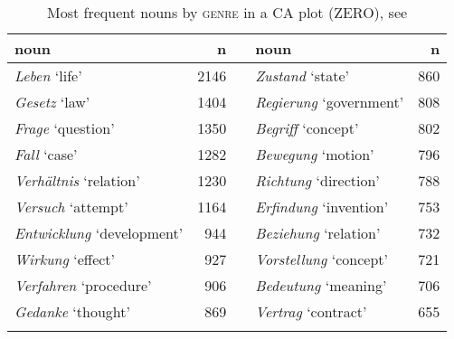 \documentclass[output=paper,colorlinks,citecolor=brown]{langscibook}
\begin{document}
\begin{table}[H]
\begin{tabularx}{\textwidth}{lr X lr}
\lsptoprule
{noun} &  n && noun & n\\
\midrule
\textit{Leben} ‘life' & 2146  &&               \textit{Zustand} ‘state' & 860\\
\textit{Gesetz} ‘law' & 1404  &&               \textit{Regierung} ‘government' & 808\\
\textit{Frage} ‘question' & 1350  &&           \textit{Begriff} ‘concept' & 802\\
\textit{Fall} ‘case' & 1282  &&                \textit{Bewegung} ‘motion' & 796\\
\textit{Verhältnis} ‘relation' & 1230  &&      \textit{Richtung} ‘direction' & 788\\
\textit{Versuch} ‘attempt' & 1164  &&          \textit{Erfindung} ‘invention' & 753\\
\textit{Entwicklung} ‘development' & 944  &&   \textit{Beziehung} ‘relation' & 732\\
\textit{Wirkung} ‘effect' & 927  &&            \textit{Vorstellung} ‘concept' & 721\\
\textit{Verfahren} ‘procedure' & 906  &&       \textit{Bedeutung} ‘meaning' & 706\\
\textit{Gedanke} ‘thought' & 869  &&           \textit{Vertrag} ‘contract' & 655\\
\lspbottomrule
\end{tabularx}
 \caption{Most frequent nouns by \textsc{genre} \textup{in a CA plot (}\textsc{ZERO}), see }
 \label{tab:fleissner:tofig17}
\end{table}


\cleardoublepage
\end{document}
